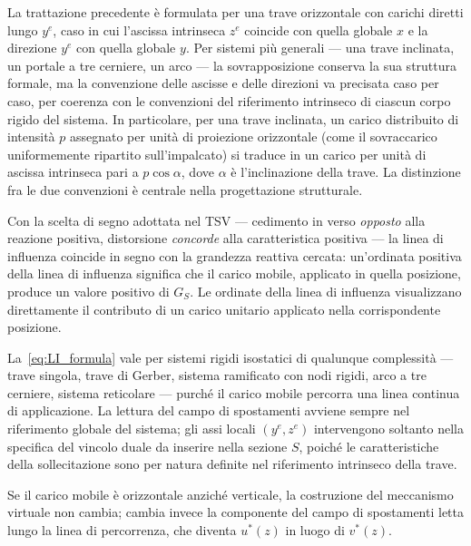 \begin{oss}
	La trattazione precedente è formulata per una trave
	orizzontale con carichi diretti lungo $y^e$, caso in cui
	l'ascissa intrinseca $z^e$ coincide con quella globale $x$
	e la direzione $y^e$ con quella globale $y$. Per sistemi
	più generali --- una trave inclinata, un portale a tre
	cerniere, un arco --- la sovrapposizione conserva la sua
	struttura formale, ma la convenzione delle ascisse e delle
	direzioni va precisata caso per caso, per coerenza con le
	convenzioni del riferimento intrinseco di ciascun corpo
	rigido del sistema. In particolare, per una trave inclinata,
	un carico distribuito di intensità $p$ assegnato per unità
	di proiezione orizzontale (come il sovraccarico
	uniformemente ripartito sull'impalcato) si traduce in un
	carico per unità di ascissa intrinseca pari a 
	$p\cos\alpha$, dove $\alpha$ è l'inclinazione della trave.
	La distinzione fra le due convenzioni è centrale nella
	progettazione strutturale.
\end{oss}


\begin{oss}
	Con la scelta di segno adottata nel TSV --- cedimento in
	verso \emph{opposto} alla reazione positiva, distorsione
	\emph{concorde} alla caratteristica positiva --- la
	linea di influenza coincide in segno con la grandezza
	reattiva cercata: un'ordinata positiva della linea di
	influenza significa che il carico mobile, applicato in
	quella posizione, produce un valore positivo di $G_S$.
	Le ordinate della linea di influenza visualizzano
	direttamente il contributo di un carico unitario
	applicato nella corrispondente posizione.
\end{oss}


\begin{oss}
	La~\eqref{eq:LI_formula} vale per sistemi rigidi
	isostatici di qualunque complessità --- trave singola,
	trave di Gerber, sistema ramificato con nodi rigidi,
	arco a tre cerniere, sistema reticolare --- purché il
	carico mobile percorra una linea continua di
	applicazione. La lettura del campo di spostamenti
	avviene sempre nel riferimento globale del sistema; gli
	assi locali $(y^e, z^e)$ intervengono soltanto nella
	specifica del vincolo duale da inserire nella sezione
	$S$, poiché le caratteristiche della sollecitazione sono
	per natura definite nel riferimento intrinseco della
	trave.
	
	Se il carico mobile è orizzontale anziché verticale, la
	costruzione del meccanismo virtuale non cambia; cambia
	invece la componente del campo di spostamenti letta
	lungo la linea di percorrenza, che diventa $u^*(z)$ in
	luogo di $v^*(z)$.
\end{oss}



